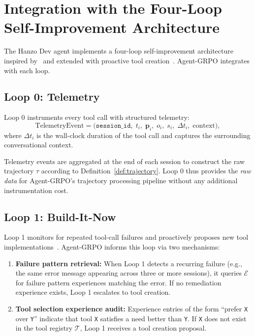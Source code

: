 \section{Integration with the Four-Loop Self-Improvement Architecture}

\label{sec:integration}

The Hanzo Dev agent implements a four-loop self-improvement architecture
inspired by~\cite{shinn2023reflexion} and extended with proactive tool
creation~\cite{wang2023voyager}. Agent-GRPO integrates with each loop.

\subsection{Loop 0: Telemetry}

Loop 0 instruments every tool call with structured telemetry:
\begin{equation}
    \text{TelemetryEvent} = \bigl(\texttt{session\_id},\; t_i,\; \bm{p}_i,\; o_i,\; s_i,\; \Delta t_i,\; \text{context}\bigr),
    \label{eq:telemetry}
\end{equation}
where $\Delta t_i$ is the wall-clock duration of the tool call and 
captures the surrounding conversational context.

Telemetry events are aggregated at the end of each session to construct the
raw trajectory $\tau$ according to Definition~\ref{def:trajectory}. Loop 0
thus provides the \emph{raw data} for Agent-GRPO's trajectory processing
pipeline without any additional instrumentation cost.

\subsection{Loop 1: Build-It-Now}

Loop 1 monitors for repeated tool-call failures and proactively proposes
new tool implementations~\cite{wang2023voyager}. Agent-GRPO informs this loop
via two mechanisms:

\begin{enumerate}[leftmargin=1.5em]
    \item \textbf{Failure pattern retrieval:} When Loop 1 detects a recurring
          failure (e.g., the same error message appearing across three or more
          sessions), it queries $\mathcal{E}$ for failure pattern experiences
          matching the error. If no remediation experience exists, Loop 1
          escalates to tool creation.
    \item \textbf{Tool selection experience audit:} Experience entries of the
          form ``prefer \texttt{X} over \texttt{Y}'' indicate that tool \texttt{X}
          satisfies a need better than \texttt{Y}. If \texttt{X} does not exist
          in the tool registry $\mathcal{T}$, Loop 1 receives a tool creation
          proposal.
\end{enumerate}

